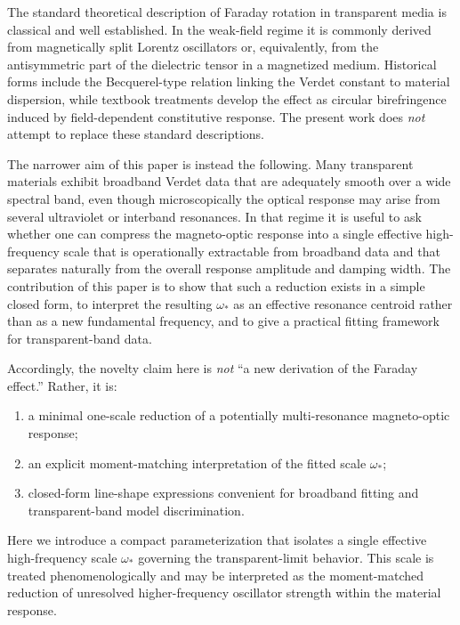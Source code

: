 \documentclass[11pt,a4paper]{article}
\begin{document}
        The standard theoretical description of Faraday rotation in transparent media is classical and well established. In the weak-field regime it is commonly derived from magnetically split Lorentz oscillators or, equivalently, from the antisymmetric part of the dielectric tensor in a magnetized medium. Historical forms include the Becquerel-type relation linking the Verdet constant to material dispersion, while textbook treatments develop the effect as circular birefringence induced by field-dependent constitutive response. The present work does \emph{not} attempt to replace these standard descriptions.
        
        The narrower aim of this paper is instead the following. Many transparent materials exhibit broadband Verdet data that are adequately smooth over a wide spectral band, even though microscopically the optical response may arise from several ultraviolet or interband resonances. In that regime it is useful to ask whether one can compress the magneto-optic response into a single effective high-frequency scale that is operationally extractable from broadband data and that separates naturally from the overall response amplitude and damping width. The contribution of this paper is to show that such a reduction exists in a simple closed form, to interpret the resulting \(\omega_\ast\) as an effective resonance centroid rather than as a new fundamental frequency, and to give a practical fitting framework for transparent-band data.
        
        Accordingly, the novelty claim here is \emph{not} ``a new derivation of the Faraday effect.'' Rather, it is:
        \begin{enumerate}
            \item a minimal one-scale reduction of a potentially multi-resonance magneto-optic response;
            \item an explicit moment-matching interpretation of the fitted scale \(\omega_\ast\);
            \item closed-form line-shape expressions convenient for broadband fitting and transparent-band model discrimination.
        \end{enumerate}
        Here we introduce a compact parameterization that isolates a single effective high-frequency scale $\omega_\ast$ governing the transparent-limit behavior. This scale is treated phenomenologically and may be interpreted as the moment-matched reduction of unresolved higher-frequency oscillator strength within the material response.
    
\end{document}
